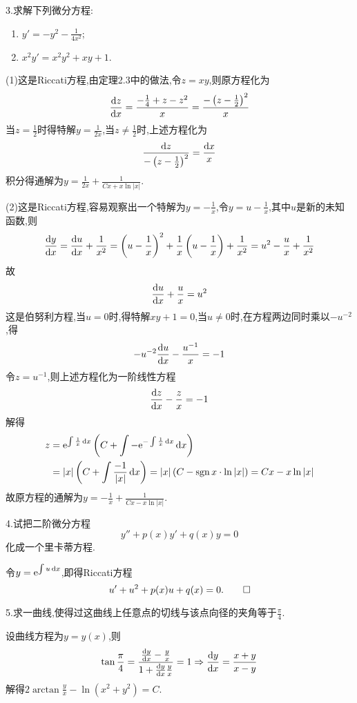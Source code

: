 3.求解下列微分方程:
\begin{enumerate}[(1)]
\item $\displaystyle y'=-y^2-\frac{1}{4x^2}$;
\item $\displaystyle x^2y'=x^2y^2+xy+1$.
\end{enumerate}

\begin{solve}
(1)这是Riccati方程,由定理2.3中的做法,令$z=xy$,则原方程化为
\[\frac{\mathop{}\!\mathrm{d} z}{\mathop{}\!\mathrm{d} x}=\frac{-\frac{1}{4}+z-z^2}{x}=\frac{-\left(z-\frac{1}{2}\right)^2}{x}\]
当$z=\frac{1}{2}$时得特解$y=\frac{1}{2x}$,当$z\neq\frac{1}{2}$时,上述方程化为
\[\frac{\mathop{}\!\mathrm{d} z}{-\left(z-\frac{1}{2}\right)^2}=\frac{\mathop{}\!\mathrm{d} x}{x}\]
积分得通解为$y=\frac{1}{2x}+\frac{1}{Cx+x\ln|x|}$.

(2)这是Riccati方程,容易观察出一个特解为$y=-\frac{1}{x}$,令$y=u-\frac{1}{x}$,其中$u$是新的未知函数,则
\[\frac{\mathop{}\!\mathrm{d} y}{\mathop{}\!\mathrm{d} x}=\frac{\mathop{}\!\mathrm{d} u}{\mathop{}\!\mathrm{d} x}+\frac{1}{x^2}=\left(u-\frac{1}{x}\right)^2+\frac{1}{x}\left(u-\frac{1}{x}\right)+\frac{1}{x^2}=u^2-\frac{u}{x}+\frac{1}{x^2}\]
故
\[\frac{\mathop{}\!\mathrm{d} u}{\mathop{}\!\mathrm{d} x}+\frac{u}{x}=u^2\]
这是伯努利方程,当$u=0$时,得特解$xy+1=0$,当$u\neq0$时,在方程两边同时乘以$-u^{-2}$,得
\[-u^{-2}\frac{\mathop{}\!\mathrm{d} u}{\mathop{}\!\mathrm{d} x}-\frac{u^{-1}}{x}=-1\]
令$z=u^{-1}$,则上述方程化为一阶线性方程
\[\frac{\mathop{}\!\mathrm{d} z}{\mathop{}\!\mathrm{d} x}-\frac{z}{x}=-1\]
解得
\[\begin{split}
z&=\mathrm{e}^{\int\frac{1}{x}\mathop{}\!\mathrm{d} x}\left(C+\int-\mathrm{e}^{-\int\frac{1}{x}\mathop{}\!\mathrm{d} x}\mathop{}\!\mathrm{d} x\right)\\
&=|x|\left(C+\int\frac{-1}{|x|}\mathop{}\!\mathrm{d} x\right)=|x|\left(C-\operatorname{sgn} x\cdot\ln|x|\right)=Cx-x\ln|x|
\end{split}\]
故原方程的通解为$y=-\frac{1}{x}+\frac{1}{Cx-x\ln|x|}$.
\end{solve}


4.试把二阶微分方程
\[y''+p(x)y'+q(x)y=0\]
化成一个里卡蒂方程.

\begin{solve}
令$y=\mathrm{e}^{\int u\mathop{}\!\mathrm{d} x}$,即得Riccati方程
\[u'+u^2+p(x)u+q(x)=0.\qedhere\]
\end{solve}


5.求一曲线,使得过这曲线上任意点的切线与该点向径的夹角等于$\frac{\pi}{4}$.

\begin{solve}
设曲线方程为$y=y(x)$,则
\[\tan\frac{\pi}{4}=\frac{\frac{\mathop{}\!\mathrm{d} y}{\mathop{}\!\mathrm{d} x}-\frac{y}{x}}{1+\frac{\mathop{}\!\mathrm{d} y}{\mathop{}\!\mathrm{d} x}\frac{y}{x}}=1\Rightarrow\frac{\mathop{}\!\mathrm{d} y}{\mathop{}\!\mathrm{d} x}=\frac{x+y}{x-y}\]
解得$2\arctan\frac{y}{x}-\ln(x^2+y^2)=C$.
\end{solve}


